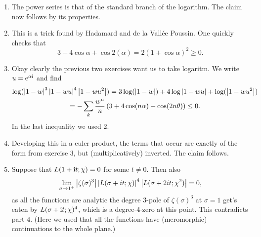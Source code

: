 \documentclass[a4paper,11pt]{article}
\begin{document}
\begin{enumerate}[wide, labelindent=0pt]
    \item The power series is that of the standard branch of the logarithm. The claim
        now follows by its properties.
    \item This is a trick found by Hadamard and de la Vall\'ee Poussin. One quickly
        checks that 
        \begin{equation*}
            3 + 4 \cos \alpha + \cos 2(\alpha) = 2(1 + \cos \alpha)^2 \geq 0.
        \end{equation*}
    \item Okay clearly the previous two exercises want us to take logaritm. We write 
        $u = \mathrm e^{\alpha \mathrm i}$ and find
        \begin{multline*}
            \log( \left\lvert 1-w \right\rvert^3 \left\lvert 1-wu \right\rvert^4 \left\lvert 1- wu^2 \right\rvert ) = 
            3\log( \left\lvert 1-w \right\rvert ) + 4\log \left\lvert 1-wu \right\rvert + \log (\left\lvert 1- wu^2 \right\rvert) \\ 
            = - \sum_k \frac {w^n}n \left( 3 + 4 \cos(n \alpha) + \cos(2 n \theta) 
                \right) \leq 0.
        \end{multline*}
        In the last inequality we used 2. 
    \item Developing this in a euler product, the terms that occur are exactly of the
        form from exercise $3$, but (multiplicatively) inverted. The claim follows.

    \item Suppose that $L(1 + \mathrm i t; \chi) = 0$ for some $t \neq 0$. Then also
        \begin{equation*}
            \lim_{\sigma \to 1^+} \left\lvert \zeta(\sigma)^3 \right\rvert\left\lvert L(\sigma + it; \chi) \right\rvert^4 
        \left\lvert L(\sigma + 2it;\chi^2) \right\rvert = 0,
        \end{equation*}
        as all the functions are analytic the degree $3$-pole of $\zeta(\sigma)^3$
        at $\sigma = 1$ get's eaten by $L(\sigma + \mathrm i t; \chi)^4$, which is a
        degree-$4$-zero at this point. This contradicts 
        part $4$. (Here we used that all the functions have
        (meromorphic) continuations to the whole plane.)
\end{enumerate}
\end{document}
